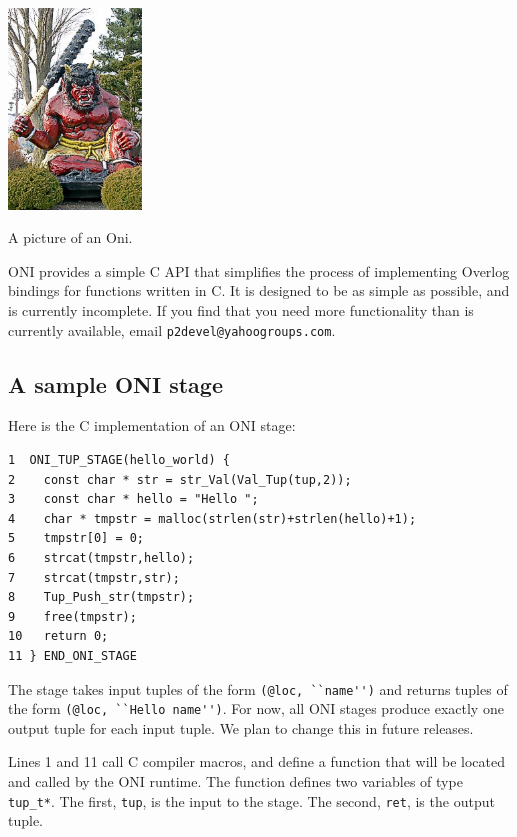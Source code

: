\documentclass{article}
\begin{document}
\begin{center}
%
%
%
%
\includegraphics[width=1.4in]{Oni.jpg}

A picture of an Oni.
\end{center}
ONI provides a simple C API that simplifies the process of
implementing Overlog bindings for functions written in C.  It is
designed to be as simple as possible, and is currently incomplete.  If
you find that you need more functionality than is currently available,
email {\tt p2devel@yahoogroups.com}.

\subsection{A sample ONI stage}

Here is the C implementation of an ONI stage:
\begin{verbatim}
1  ONI_TUP_STAGE(hello_world) {
2    const char * str = str_Val(Val_Tup(tup,2));
3    const char * hello = "Hello ";
4    char * tmpstr = malloc(strlen(str)+strlen(hello)+1);
5    tmpstr[0] = 0;
6    strcat(tmpstr,hello);
7    strcat(tmpstr,str);
8    Tup_Push_str(tmpstr);
9    free(tmpstr);
10   return 0;
11 } END_ONI_STAGE
\end{verbatim}
The stage takes input tuples of the form \lstinline$(@loc, ``name'')$
and returns tuples of the form \lstinline$(@loc, ``Hello name'')$.
For now, all ONI stages produce exactly one output tuple for each
input tuple.  We plan to change this in future releases.

Lines 1 and 11 call C compiler macros, and define a function that will
be located and called by the ONI runtime.  The function defines two
variables of type {\tt tup\_t*}.  The first, {\tt tup}, is the input to
the stage.  The second, {\tt ret}, is the output tuple.
\end{document}
